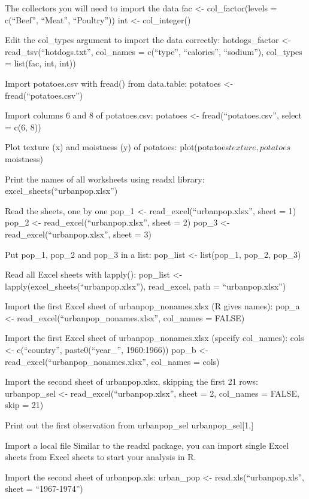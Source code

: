 \documentclass[]{book}
\begin{document}
The collectors you will need to import the data
fac \textless{}- col\_factor(levels = c(``Beef'', ``Meat'', ``Poultry''))
int \textless{}- col\_integer()

Edit the col\_types argument to import the data correctly:
hotdogs\_factor \textless{}- read\_tsv(``hotdogs.txt'',
col\_names = c(``type'', ``calories'', ``sodium''),
col\_types = list(fac, int, int))

Import potatoes.csv with fread() from data.table:
potatoes \textless{}- fread(``potatoes.csv'')

Import columns 6 and 8 of potatoes.csv:
potatoes \textless{}- fread(``potatoes.csv'', select = c(6, 8))

Plot texture (x) and moistness (y) of potatoes:
plot(potatoes\(texture, potatoes\)moistness)

Print the names of all worksheets using readxl library:
excel\_sheets(``urbanpop.xlsx'')

Read the sheets, one by one
pop\_1 \textless{}- read\_excel(``urbanpop.xlsx'', sheet = 1)
pop\_2 \textless{}- read\_excel(``urbanpop.xlsx'', sheet = 2)
pop\_3 \textless{}- read\_excel(``urbanpop.xlsx'', sheet = 3)

Put pop\_1, pop\_2 and pop\_3 in a list:
pop\_list \textless{}- list(pop\_1, pop\_2, pop\_3)

Read all Excel sheets with lapply():
pop\_list \textless{}- lapply(excel\_sheets(``urbanpop.xlsx''), read\_excel, path = ``urbanpop.xlsx'')

Import the first Excel sheet of urbanpop\_nonames.xlsx (R gives names):
pop\_a \textless{}- read\_excel(``urbanpop\_nonames.xlsx'', col\_names = FALSE)

Import the first Excel sheet of urbanpop\_nonames.xlsx (specify col\_names):
cols \textless{}- c(``country'', paste0(``year\_'', 1960:1966))
pop\_b \textless{}- read\_excel(``urbanpop\_nonames.xlsx'', col\_names = cols)

Import the second sheet of urbanpop.xlsx, skipping the first 21 rows:
urbanpop\_sel \textless{}- read\_excel(``urbanpop.xlsx'', sheet = 2, col\_names = FALSE, skip = 21)

Print out the first observation from urbanpop\_sel
urbanpop\_sel{[}1,{]}

Import a local file
Similar to the readxl package, you can import single Excel sheets from Excel sheets to start your analysis in R.

Import the second sheet of urbanpop.xls:
urban\_pop \textless{}- read.xls(``urbanpop.xls'', sheet = ``1967-1974'')
\end{document}
